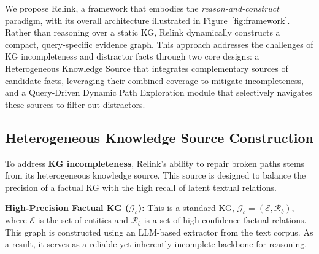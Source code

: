 \documentclass[letterpaper]{article} %
\begin{document}
We propose Relink, a framework that embodies the \textit{reason-and-construct} paradigm, with its overall architecture illustrated in Figure~\ref{fig:framework}. Rather than reasoning over a static KG, Relink dynamically constructs a compact, query-specific evidence graph. This approach addresses the challenges of KG incompleteness and distractor facts through two core designs: a Heterogeneous Knowledge Source that integrates complementary sources of candidate facts, leveraging their combined coverage to mitigate incompleteness, and a Query-Driven Dynamic Path Exploration module that selectively navigates these sources to filter out distractors.



\subsection{Heterogeneous Knowledge Source Construction}
To address \textbf{KG incompleteness}, Relink's ability to repair broken paths stems from its heterogeneous knowledge source. This source is designed to balance the precision of a factual KG with the high recall of latent textual relations.

\vspace{0.3em}
\noindent\textbf{High-Precision Factual KG ($\mathcal{G}_b$):} This is a standard KG, $\mathcal{G}_b = (\mathcal{E}, \mathcal{R}_b)$, where $\mathcal{E}$ is the set of entities and $\mathcal{R}_b$ is a set of high-confidence factual relations. This graph is constructed using an LLM-based extractor from the text corpus. As a result, it serves as a reliable yet inherently incomplete backbone for reasoning.
\end{document}
